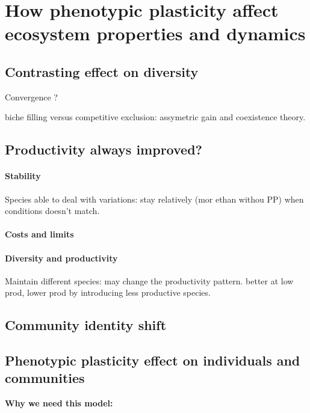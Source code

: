 \section{How phenotypic plasticity affect ecosystem properties and dynamics}

\subsection{Contrasting effect on diversity}

Convergence ?

biche filling versus competitive exclusion: assymetric gain and coexistence theory.

\subsection{Productivity always improved?}

\paragraph{Stability}

Species able to deal with variations: stay relatively (mor ethan withou PP) when conditions doesn't match.


\paragraph{Costs and limits}

\paragraph{Diversity and productivity}
Maintain different species: may change the productivity pattern. better at low prod, lower prod by introducing less productive species.


\subsection{Community identity shift}

\textbf{}


\subsection{Phenotypic plasticity effect on individuals and communities}

\textbf{Why we need this model: }



